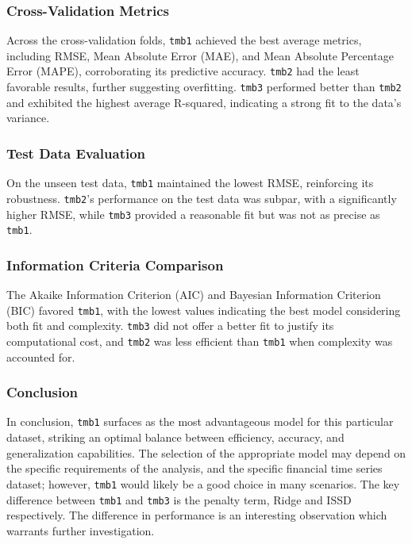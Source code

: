 \documentclass[12pt, twoside,hidelinks]{article}
\theoremstyle{definition}
\numberwithin{equation}{section}
\begin{document}
\subsubsection*{Cross-Validation Metrics}
Across the cross-validation folds, \texttt{tmb1} achieved the best average metrics, including RMSE, Mean Absolute Error (MAE), and Mean Absolute Percentage Error (MAPE), corroborating its predictive accuracy. \texttt{tmb2} had the least favorable results, further suggesting overfitting. \texttt{tmb3} performed better than \texttt{tmb2} and exhibited the highest average R-squared, indicating a strong fit to the data's variance.

\subsubsection*{Test Data Evaluation}
On the unseen test data, \texttt{tmb1} maintained the lowest RMSE, reinforcing its robustness. \texttt{tmb2}'s performance on the test data was subpar, with a significantly higher RMSE, while \texttt{tmb3} provided a reasonable fit but was not as precise as \texttt{tmb1}.

\subsubsection*{Information Criteria Comparison}
The Akaike Information Criterion (AIC) and Bayesian Information Criterion (BIC) favored \texttt{tmb1}, with the lowest values indicating the best model considering both fit and complexity. \texttt{tmb3} did not offer a better fit to justify its computational cost, and \texttt{tmb2} was less efficient than \texttt{tmb1} when complexity was accounted for.


\subsubsection*{Conclusion}

In conclusion, \texttt{tmb1} surfaces as the most advantageous model for this particular dataset, striking an optimal balance between efficiency, accuracy, and generalization capabilities. The selection of the appropriate model may depend on the specific requirements of the analysis, and the specific financial time series dataset; however, \texttt{tmb1} would likely be a good choice in many scenarios. The key difference between \texttt{tmb1} and \texttt{tmb3} is the penalty term, Ridge and ISSD respectively. The difference in performance is an interesting observation which warrants further investigation.
\end{document}

